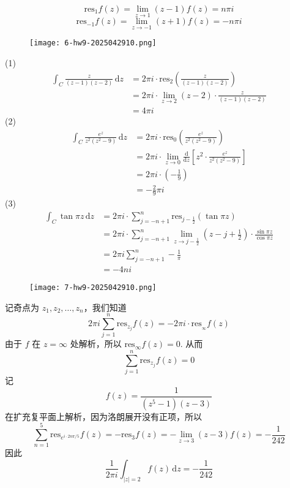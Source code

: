 \[
\mathrm{res}_{1}f(z)=\lim_{ z \to 1 } (z-1)f(z)=n\pi i
\]
\[
\mathrm{res}_{-1}f(z)=\lim_{ z \to -1 } (z+1)f(z)=-n\pi i
\]
\begin{exercise}
\begin{figure}[H]
\centering
\texttt{[image: 6-hw9-2025042910.png]}
\label{}
\end{figure}
\end{exercise}
(1)
\[
\begin{aligned}
\int_{C}^{} \frac{z}{(z-1)(z-2)} \, \mathrm{d}z & =2\pi i\cdot \mathrm{res}_{2} \left( \frac{z}{(z-1)(z-2)} \right) \\
 & =2\pi i\cdot \lim_{ z \to 2 } (z-2)\cdot\frac{z}{(z-1)(z-2)} \\
 & =4\pi i
\end{aligned}
\]
(2)
\[
\begin{aligned}
\int_{C}^{} \frac{e^{ z }}{z^2(z^2-9)} \, \mathrm{d}z  & =2\pi i\cdot \mathrm{res}_{0}\left( \frac{e^{ z }}{z^2(z^2-9)} \right) \\
 & =2\pi i\cdot \lim_{ z \to 0 } \frac{\mathrm{d}}{\mathrm{d}z} \left[ z^2\cdot\frac{e^{ z }}{z^2(z^2-9)} \right] \\
 & =2\pi i \cdot\left( -\frac{1}{9} \right) \\
 & =-\frac{2}{9}\pi i
\end{aligned}
\]
(3)
\[
\begin{aligned}
\int_{C}^{} \tan \pi z \, \mathrm{d}z & =2\pi i\cdot \sum_{j=-n+1}^{n} \mathrm{res}_{j-\frac{1}{2}}(\tan \pi z) \\
 & =2\pi i\cdot \sum_{j=-n+1}^{n} \lim_{ z \to j-\frac{1}{2} } \left( z-j+\frac{1}{2} \right)\cdot\frac{\sin \pi z}{\cos \pi z} \\
 & =2\pi i\sum_{j=-n+1}^{n} -\frac{1}{\pi}  \\
 & =-4ni
\end{aligned}
\]
\begin{exercise}
\begin{figure}[H]
\centering
\texttt{[image: 7-hw9-2025042910.png]}
\label{}
\end{figure}
\end{exercise}
记奇点为 $z_1,z_2,\dots,z_n$，我们知道
\[
2\pi i \sum_{j=1}^{n}\mathrm{res}_{z_j}f(z)=-2\pi i\cdot\mathrm{res}_{_{\infty}}f(z)
\]
由于 $f$ 在 $z=\infty$ 处解析，所以 $\mathrm{res}_{\infty}f(z)=0$. 从而
\[
\sum_{j=1}^{n} \mathrm{res}_{z_j}f(z)=0
\]
记
\[
f(z)=\frac{1}{(z^{5}-1)(z-3)}
\]
在扩充复平面上解析，因为洛朗展开没有正项，所以
\[
\sum_{n=1}^{5} \mathrm{res}_{e^{ i\cdot2n\pi /5 }}f(z)=-\mathrm{res}_{3}f(z)=-\lim_{ z \to 3 } (z-3)f(z)=-\frac{1}{242}
\]
因此
\[
\frac{1}{2\pi i}\int_{\lvert z \rvert =2}^{} f(z) \, \mathrm{d}z =-\frac{1}{242} 
\]